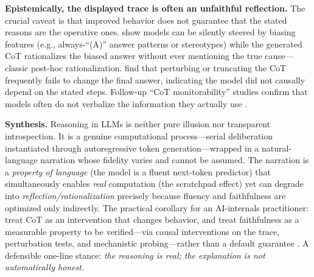 \documentclass[11pt]{article}
\begin{document}
\textbf{Epistemically, the displayed trace is often an unfaithful reflection.}
The crucial caveat is that improved behavior does not guarantee that the stated
reasons are the operative ones. \citet{turpin2023language} show models can be
silently steered by biasing features (e.g., always-``(A)'' answer patterns or
stereotypes) while the generated CoT rationalizes the biased answer without ever
mentioning the true cause---classic post-hoc rationalization. \citet{lanham2023measuring}
find that perturbing or truncating the CoT frequently fails to change the final
answer, indicating the model did not causally depend on the stated steps.
Follow-up ``CoT monitorability'' studies confirm that models often do not
verbalize the information they actually use \citep{chen2025reasoning}.

\textbf{Synthesis.} Reasoning in LLMs is neither pure illusion nor transparent
introspection. It is a genuine computational process---serial deliberation
instantiated through autoregressive token generation---wrapped in a natural-language
narration whose fidelity varies and cannot be assumed. The narration is a
\emph{property of language} (the model is a fluent next-token predictor) that
simultaneously enables \emph{real} computation (the scratchpad effect) yet can
degrade into \emph{reflection/rationalization} precisely because fluency and
faithfulness are optimized only indirectly. The practical corollary for an
AI-internals practitioner: treat CoT as an intervention that changes behavior, and
treat faithfulness as a measurable property to be verified---via causal
interventions on the trace, perturbation tests, and mechanistic probing---rather
than a default guarantee \citep{lanham2023measuring,turpin2023language}.
A defensible one-line stance: \emph{the reasoning is real; the explanation is not
automatically honest.}
\end{document}
